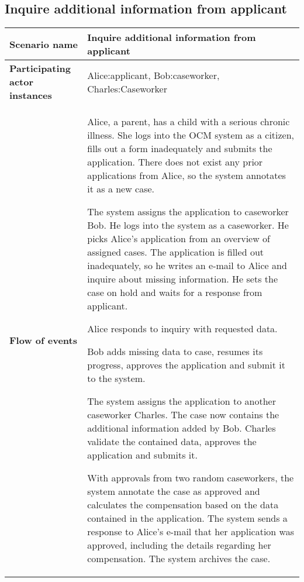 \subsection*{Inquire additional information from applicant}
\begin{table}[htb!]
\begin{tabularx}{\textwidth}{l|X}
	\textbf{Scenario name} & Inquire additional information from applicant \\
	\hline
	\textbf{Participating actor instances} & Alice:applicant, Bob:caseworker, Charles:Caseworker\\
	\hline
	\textbf{Flow of events} &
	\begin{compactenum}
	        \item Alice, a parent, has a child with a serious chronic illness. She logs into the OCM system as a citizen, fills out a form inadequately and submits the application. There does not exist any prior applications from Alice, so the system annotates it as a new case.
	        \item The system assigns the application to caseworker Bob. He logs into the system as a caseworker. He picks Alice's application from an overview of assigned cases. The application is filled out inadequately, so he writes an e-mail to Alice and inquire about missing information. He sets the case on hold and waits for a response from applicant. 
	        \item Alice responds to inquiry with requested data. 
	        \item Bob adds missing data to case, resumes its progress, approves the application and submit it to the system.
	        \item The system assigns the application to another caseworker Charles. The case now contains the additional information added by Bob. Charles validate the contained data, approves the application and submits it.
	        \item With approvals from two random caseworkers, the system annotate the case as approved and calculates the compensation based on the data contained in the application. The system sends a response to Alice's e-mail that her application was approved, including the details regarding her compensation. The system archives the case.
	\end{compactenum}\\
	\hline
\end{tabularx}
\end{table}

\newpage
